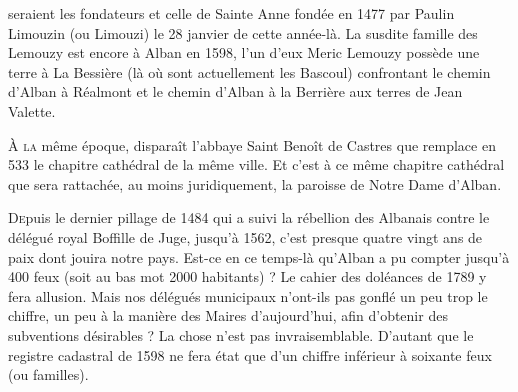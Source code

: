 
seraient les fondateurs et celle de Sainte Anne fondée en 1477 par Paulin Limouzin (ou Limouzi) le 28 janvier de cette année-là. La susdite famille des Lemouzy est encore à Alban en 1598, l'un d'eux Meric Lemouzy possède une terre à La Bessière (là où sont actuellement les Bascoul) confrontant le chemin d'Alban à Réalmont et le chemin d'Alban à la Berrière aux terres de Jean Valette.

\medskip

\lettrine{À}{ la} même époque, disparaît l'abbaye Saint Benoît de Castres que remplace en 533 le chapitre cathédral de la même ville. Et c'est à ce même chapitre cathédral que sera rattachée, au moins juridiquement, la paroisse de Notre Dame d'Alban.

\medskip

\lettrine{D}{e}puis le dernier pillage de 1484 qui a suivi la rébellion des Albanais contre le délégué royal Boffille de Juge, jusqu'à 1562, c'est presque quatre vingt ans de paix dont jouira notre pays. Est-ce en ce temps-là qu'Alban a pu compter jusqu'à 400 feux (soit au bas mot 2000 habitants) ? Le cahier des doléances de 1789 y fera allusion. Mais nos délégués municipaux n'ont-ils pas gonflé un peu trop le chiffre, un peu à la manière des Maires d'aujourd'hui, afin d'obtenir des subventions désirables ? La chose n'est pas invraisemblable. D'autant que le registre cadastral de 1598 ne fera état que d'un chiffre inférieur à soixante feux (ou familles).
